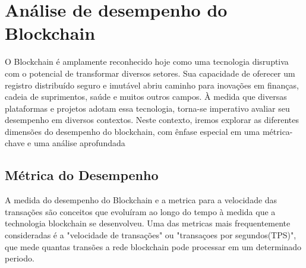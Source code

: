 
\chapter{Análise de desempenho do Blockchain}
\label{chapter_desempenho}


      O Blockchain é amplamente reconhecido hoje como uma tecnologia disruptiva com o potencial de transformar diversos setores. Sua capacidade de oferecer um registro distribuído seguro e imutável abriu caminho para inovações em finanças, cadeia de suprimentos, saúde e muitos outros campos. À medida que diversas plataformas e projetos adotam essa tecnologia, torna-se imperativo avaliar seu desempenho em diversos contextos. Neste contexto, iremos explorar as diferentes dimensões do desempenho do blockchain, com ênfase especial em uma métrica-chave e uma análise aprofundada

\section{Métrica do Desempenho}

    A medida do desempenho do Blockchain e a metrica para a velocidade das transações são conceitos que evoluíram ao longo do tempo à medida que a technologia blockchain se desenvolveu. Uma das metricas mais frequentemente consideradas é a "velocidade de transações" ou "transaçoes por segundos(TPS)", que mede quantas transões a rede blockchain pode processar em um determinado periodo. 

